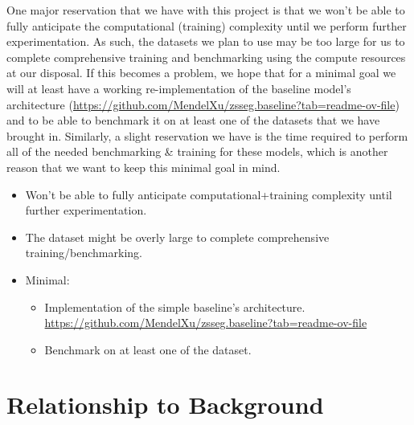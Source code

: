 \documentclass[10pt,twocolumn,letterpaper]{article}
\begin{document}
One major reservation that we have with this project is that we won’t be able to fully anticipate the computational (training) complexity until we perform further experimentation. As such, the datasets we plan to use may be too large for us to complete comprehensive training and benchmarking using the compute resources at our disposal. If this becomes a problem, we hope that for a minimal goal we will at least have a working re-implementation of the baseline model’s architecture (\url{https://github.com/MendelXu/zsseg.baseline?tab=readme-ov-file}) and to be able to benchmark it on at least one of the datasets that we have brought in. Similarly, a slight reservation we have is the time required to perform all of the needed benchmarking \& training for these models, which is another reason that we want to keep this minimal goal in mind. 
\begin{itemize}
    \item Won’t be able to fully anticipate computational+training complexity until further experimentation.
    \item The dataset might be overly large to complete comprehensive training/benchmarking.
    \item Minimal:
    \begin{itemize}
        \item Implementation of the simple baseline’s architecture. \url{https://github.com/MendelXu/zsseg.baseline?tab=readme-ov-file}
        \item Benchmark on at least one of the dataset.
    \end{itemize}
\end{itemize}


\section{Relationship to Background}
\end{document}
